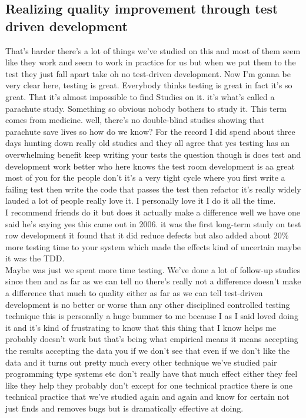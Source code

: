 \documentclass[conference, compsoc, twoside]{IEEEtran}
\begin{document}
\subsection{Realizing quality improvement through test driven development}
That's harder there's a lot of things we've studied on this and most of them seem like they work and seem to work in practice for us but when we put them to the test they just fall apart take oh no test-driven development.
Now I'm gonna be very clear here, testing is great. 
Everybody thinks testing is great in fact it's so great.
That it's almost impossible to find Studies on it.
it's what's called a parachute study. 
Something so obvious nobody bothers to study it.
This term comes from medicine. well, there's no double-blind studies showing that parachute save lives so how do we know?  
For the record I did spend about three days hunting down really old studies and they all agree that yes testing has an overwhelming benefit keep writing your tests the question though is does test and development work better
who here knows the test room development is aa great most of you for the people don't it's a very tight cycle
where you first write a failing test then write the code that passes the test then refactor it's really widely lauded a lot of people really love it. I personally love it I do it all the time.
\\
I recommend friends do it but does it actually make a difference well we have one said he's saying yes this came out in 2006. it was the first long-term study on test row development it found that it did reduce defects but also added about 20\% more testing time to your system which made the effects kind of uncertain maybe it was the TDD.  
\\
Maybe was just we spent more time testing.
We've done a lot of follow-up studies since then and as far as we can tell no there's really not a difference doesn't make a difference that much to quality either as far as we can tell test-driven development is no better or worse than any other disciplined controlled testing technique this is personally a huge bummer to me because I as I said loved doing it and it's kind of frustrating to know that this thing that I know helps me probably doesn't work but that's being what empirical means it means accepting the results accepting the data you if we don't see that even if we don't like the data and it turns out pretty much every other technique we've studied pair programming type systems etc don't really have that much effect either they feel like they help they probably don't except for one technical practice there is one technical practice that we've studied again and again and know for certain not just finds and removes bugs but is dramatically effective at doing.\\
\end{document}
